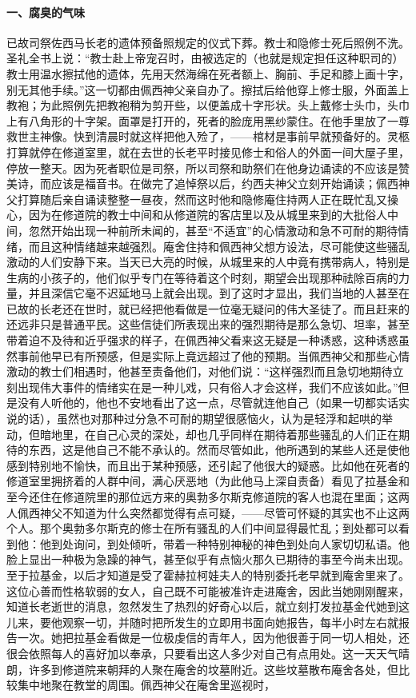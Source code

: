 \paragraph*{一、腐臭的气味}
\par 已故司祭佐西马长老的遗体预备照规定的仪式下葬。教士和隐修士死后照例不洗。圣礼全书上说：“教士赴上帝宠召时，由被选定的（也就是规定担任这种职司的）教士用温水擦拭他的遗体，先用天然海绵在死者额上、胸前、手足和膝上画十字，别无其他手续。”这一切都由佩西神父亲自办了。擦拭后给他穿上修士服，外面盖上教袍；为此照例先把教袍稍为剪开些，以便盖成十字形状。头上戴修士头巾，头巾上有八角形的十字架。面罩是打开的，死者的脸庞用黑纱蒙住。在他手里放了一尊救世主神像。快到清晨时就这样把他入殓了，——棺材是事前早就预备好的。灵柩打算就停在修道室里，就在去世的长老平时接见修士和俗人的外面一间大屋子里，停放一整天。因为死者职位是司祭，所以司祭和助祭们在他身边诵读的不应该是赞美诗，而应该是福音书。在做完了追悼祭以后，约西夫神父立刻开始诵读；佩西神父打算随后亲自诵读整整一昼夜，然而这时他和隐修庵住持两人正在既忙乱又操心，因为在修道院的教士中间和从修道院的客店里以及从城里来到的大批俗人中间，忽然开始出现一种前所未闻的，甚至“不适宜”的心情激动和急不可耐的期待情绪，而且这种情绪越来越强烈。庵舍住持和佩西神父想方设法，尽可能使这些骚乱激动的人们安静下来。当天已大亮的时候，从城里来的人中竟有携带病人，特别是生病的小孩子的，他们似乎专门在等待着这个时刻，期望会出现那种祛除百病的力量，并且深信它毫不迟延地马上就会出现。到了这时才显出，我们当地的人甚至在已故的长老还在世时，就已经把他看做是一位毫无疑问的伟大圣徒了。而且赶来的还远非只是普通平民。这些信徒们所表现出来的强烈期待是那么急切、坦率，甚至带着迫不及待和近乎强求的样子，在佩西神父看来这无疑是一种诱惑，这种诱惑虽然事前他早已有所预感，但是实际上竟远超过了他的预期。当佩西神父和那些心情激动的教士们相遇时，他甚至责备他们，对他们说：“这样强烈而且急切地期待立刻出现伟大事件的情绪实在是一种儿戏，只有俗人才会这样，我们不应该如此。”但是没有人听他的，他也不安地看出了这一点，尽管就连他自己（如果一切都实话实说的话），虽然也对那种过分急不可耐的期望很感恼火，认为是轻浮和起哄的举动，但暗地里，在自己心灵的深处，却也几乎同样在期待着那些骚乱的人们正在期待的东西，这是他自己不能不承认的。然而尽管如此，他所遇到的某些人还是使他感到特别地不愉快，而且出于某种预感，还引起了他很大的疑惑。比如他在死者的修道室里拥挤着的人群中间，满心厌恶地（为此他马上深自责备）看见了拉基金和至今还住在修道院里的那位远方来的奥勃多尔斯克修道院的客人也混在里面；这两人佩西神父不知道为什么突然都觉得有点可疑，——尽管可怀疑的其实也不止这两个人。那个奥勃多尔斯克的修士在所有骚乱的人们中间显得最忙乱；到处都可以看到他：他到处询问，到处倾听，带着一种特别神秘的神色到处向人家切切私语。他脸上显出一种极为急躁的神气，甚至似乎有点恼火那久已期待的事至今尚未出现。至于拉基金，以后才知道是受了霍赫拉柯娃夫人的特别委托老早就到庵舍里来了。这位心善而性格软弱的女人，自己既不可能被准许走进庵舍，因此当她刚刚醒来，知道长老逝世的消息，忽然发生了热烈的好奇心以后，就立刻打发拉基金代她到这儿来，要他观察一切，并随时把所发生的立即用书面向她报告，每半小时左右就报告一次。她把拉基金看做是一位极虔信的青年人，因为他很善于同一切人相处，还很会依照每人的喜好加以奉承，只要看出这人多少对自己有点用处。这一天天气晴朗，许多到修道院来朝拜的人聚在庵舍的坟墓附近。这些坟墓散布庵舍各处，但比较集中地聚在教堂的周围。佩西神父在庵舍里巡视时，